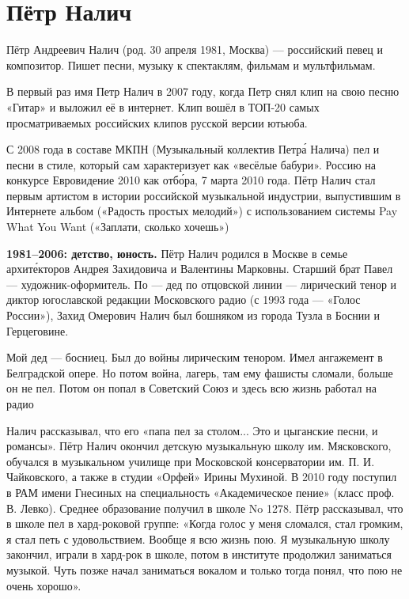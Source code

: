 \section{Пётр Налич}
Пётр Андреевич Налич (род. 30 апреля 1981, Москва) --- российский певец и композитор. Пишет песни, музыку к спектаклям, фильмам и мультфильмам.

В первый раз имя Петр Налич  в 2007 году, когда Петр снял клип на свою песню «Гитар» и выложил её в интернет. Клип вошёл в ТОП-20 самых просматриваемых российских клипов русской версии ютьюба.

С 2008 года в составе МКПН (Музыкальный коллектив Петр\'{а} Налича) пел и  песни в стиле, который сам характеризует как «весёлые бабури».  Россию на конкурсе Евровидение 2010 как  отб\'{о}ра,  7 марта 2010 года. Пётр Налич стал первым артистом в истории российской музыкальной индустрии, выпустившим в Интернете альбом («Радость простых мелодий») с использованием системы Pay What You Want («Заплати, сколько хочешь»)

\textbf{1981--2006: детство, юность.}
Пётр Налич родился в Москве в семье архит\'{е}кторов Андрея Захидовича и Валентины Марковны. Старший брат Павел --- художник-оформитель. По  --- дед по отцовской линии --- лирический тенор и диктор югославской редакции Московского радио (с 1993 года --- «Голос России»), Захид Омерович Налич был бошняком из города Тузла в Боснии и Герцеговине.

\begin{fancyquotes}
    Мой дед --- босниец. Был до войны лирическим тенором. Имел ангажемент в Белградской опере. Но потом война, лагерь, там ему фашисты  сломали, больше он не пел. Потом он попал в Советский Союз и здесь всю жизнь работал на радио
\end{fancyquotes}

Налич рассказывал, что его «папа  пел за столом... Это и цыганские песни, и романсы». Пётр Налич окончил детскую музыкальную школу им. Мясковского, обучался в музыкальном училище при Московской консерватории им. П. И. Чайковского, а также в студии «Орфей»  Ирины Мухиной. В 2010 году поступил в РАМ имени Гнесиных на специальность «Академическое пение» (класс проф. В. Левко). Среднее образование получил в школе No 1278. Пётр рассказывал, что в школе пел в хард-роковой группе: «Когда голос у меня сломался, стал громким, я стал петь с удовольствием. Вообще я всю жизнь пою. Я музыкальную школу закончил, играли в хард-рок в школе, потом в институте продолжил заниматься музыкой. Чуть позже начал заниматься вокалом и только тогда понял, что пою не очень хорошо».

